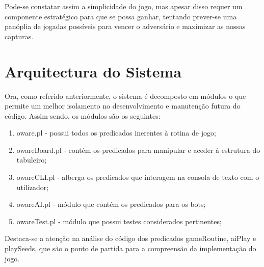 \documentclass[15pt,a4paper]{article}
\begin{document}
Pode-se constatar assim a simplicidade do jogo, mas apesar disso requer um componente estratégico para que se possa ganhar, tentando prever-se uma panóplia de jogadas possíveis para vencer o adversário e maximizar as nossas capturas.

\section{Arquitectura do Sistema}
Ora, como referido anteriormente, o sistema é decomposto em módulos o que permite um melhor isolamento no desenvolvimento e manutenção futura do código. Assim sendo, os módulos são os seguintes:
\begin{enumerate}
  \item oware.pl - possui todos os predicados inerentes à rotina de jogo;
  \item owareBoard.pl - contém os predicados para manipular e aceder à estrutura do tabuleiro;
  \item owareCLI.pl - alberga os predicados que interagem na consola de texto com o utilizador;
  \item owareAI.pl - módulo que contém os predicados para os bots;
  \item owareTest.pl - módulo que possui testes considerados pertinentes;
\end{enumerate}
Destaca-se a atenção na análise do código dos predicados gameRoutine, aiPlay e playSeeds, que são o ponto de partida para a compreensão da implementação do jogo.
\end{document}
